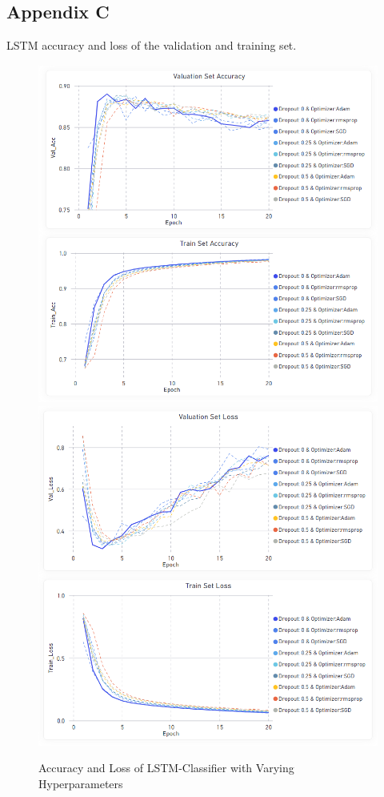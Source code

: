 \documentclass[11pt, a4paper]{article}
\begin{document}
\newpage
\subsection{Appendix C}
LSTM accuracy and loss of the validation and training set.
\label{appendix:LSTM_Sentiment_Classifier}
\begin{figure}[!h]
    \centering
    \includegraphics[scale=0.43]{LSTM_Accuracy.png}
    \includegraphics[scale=0.43]{LSTM_Loss.png}
    \caption{Accuracy and Loss of LSTM-Classifier with Varying Hyperparameters}
    \label{fig:lstm_acc_loss}
\end{figure}
\end{document}
